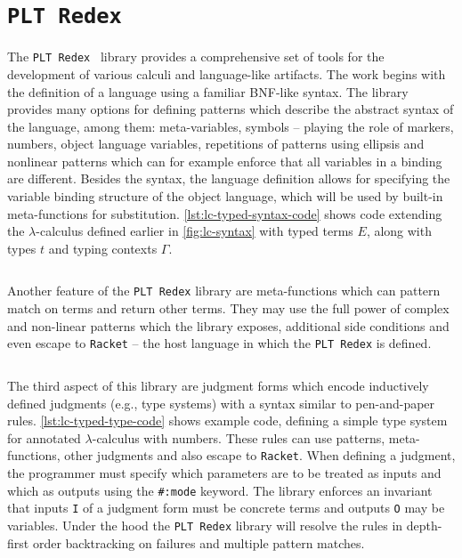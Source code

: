 \documentclass[inz, english, longabstract]{iithesis}
\newcommand{\Redex}{\texttt{PLT Redex}}
\newcommand{\Racket}{\texttt{Racket}}
\newcommand{\LC}{\(\lambda\)-calculus}
\begin{document}
\section{\Redex}
The \Redex{}~\cite{Felleisen2009} library provides a comprehensive set of tools for the development of various calculi and language-like artifacts.
The work begins with the definition of a language using a familiar BNF-like syntax.
The library provides many options for defining patterns which describe the abstract syntax of the language, among them: meta-variables, symbols -- playing the role of markers, numbers, object language variables, repetitions of patterns using ellipsis and nonlinear patterns which can for example enforce that all variables in a binding are different.
Besides the syntax, the language definition allows for specifying the variable binding structure of the object language, which will be used by built-in meta-functions for substitution.
\autoref{lst:lc-typed-syntax-code} shows code extending the \LC{} defined earlier in \autoref{fig:lc-syntax} with typed terms $ E $, along with types $ t $ and typing contexts $ \Gamma $.
\begin{listing}[t]
  \inputminted[firstline=26, lastline=32]{Racket}{../lc/lc.rkt}
  \caption{Typed \LC{} with numbers in \Redex{}}
  \label{lst:lc-typed-syntax-code}
\end{listing}
Another feature of the \Redex{} library are meta-functions which can pattern match on terms and return other terms.
They may use the full power of complex and non-linear patterns which the library exposes, additional side conditions and even escape to \Racket{} -- the host language in which the \Redex{} is defined.

\begin{listing}[t]
  \inputminted[firstline=34,lastline=51]{Racket}{../lc/lc.rkt}
  \caption{Type system for \LC{} in \Redex{}}
  \label{lst:lc-typed-type-code}
\end{listing}

The third aspect of this library are judgment forms which encode inductively defined judgments (e.g., type systems) with a syntax similar to pen-and-paper rules. \autoref{lst:lc-typed-type-code} shows example code, defining a simple type system for annotated \LC{} with numbers.
These rules can use patterns, meta-functions, other judgments and also escape to \Racket{}.
When defining a judgment, the programmer must specify which parameters are to be treated as inputs and which as outputs using the \texttt{#:mode} keyword.
The library enforces an invariant that inputs \texttt{I} of a judgment form must be concrete terms and outputs \texttt{O} may be variables.
Under the hood the \Redex{} library will resolve the rules in depth-first order backtracking on failures and multiple pattern matches.
\end{document}
